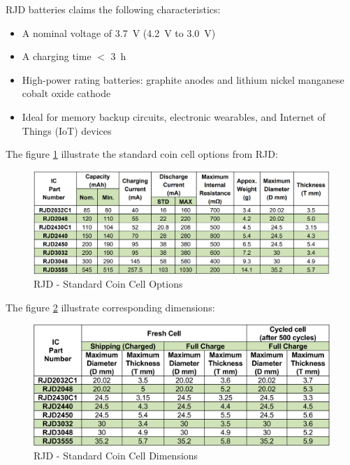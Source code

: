 \documentclass[report.tex]{subfiles}
\begin{document}
RJD batteries claims the following characteristics:
\begin{itemize}
\item A nominal voltage of \SI{3.7}{\volt} (\SI{4.2}{\volt} to \SI{3.0}{\volt})
\item A charging time $<$ \SI{3}{\hour}
\item High-power rating batteries: graphite anodes and lithium nickel manganese cobalt oxide cathode
\item Ideal for memory backup circuits, electronic wearables, and Internet of Things (IoT) devices\\
\end{itemize} 

The figure \ref{fig:rjd_standard_coin_cell_options} illustrate the standard coin cell options from \textsc{RJD}:

\begin{figure}[H]
	\centering
	\includegraphics[width=1\textwidth]{Include/Figure/Hardware/rjd_standard_coin_cell_options.png}
	\caption{RJD - Standard Coin Cell Options\cite{rjdLiIon}}
	\label{fig:rjd_standard_coin_cell_options}
\end{figure}

The figure \ref{fig:rjd_cell_dimensions} illustrate corresponding dimensions:


\begin{figure}[H]
	\centering
	\includegraphics[width=1\textwidth]{Include/Figure/Hardware/rjd_cell_dimensions.png}
	\caption{RJD - Standard Coin Cell Dimensions\cite{rjdLiIon}}
	\label{fig:rjd_cell_dimensions}
\end{figure}
\end{document}
